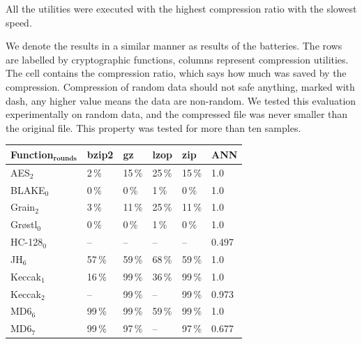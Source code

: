 \documentclass[
    digital,    %
    oneside,    %
    color,
    11pt,
    nocover,
    notable,
    nolof,
    nolot,
]{fithesis3}
\newcommand{\fd}{\cellcolor{myred!15}}
\newcommand{\fn}{\cellcolor{mygreen!20}}
\begin{document}
All the utilities were executed with the highest compression ratio with the slowest speed.

We denote the results in a similar manner as results of the batteries. The rows are labelled by cryptographic functions, columns represent compression utilities. The cell contains the compression ratio, which says how much was saved by the compression. Compression of random data should not safe anything, marked with dash, any higher value means the data are non-random. We tested this evaluation experimentally on random data, and the compressed file was never smaller than the original file. This property was tested for more than ten samples.

\begin{table}[t]
\centering

\begin{tabular}{@{}l|lllll}
\textbf{\large Function$_{\textbf{rounds}}$} & 
\multicolumn{1}{R{1.1cm}}{\textbf{bzip2}} &
\multicolumn{1}{R{1.1cm}}{\textbf{gz}} &
\multicolumn{1}{R{1.1cm}}{\textbf{lzop}} &
\multicolumn{1}{R{1.1cm}}{\textbf{zip}} &
\multicolumn{1}{R{1.1cm}}{\textbf{ANN}} \\ \hline
AES$_{2}$                        & 2\,\%  \fd & 15\,\% \fd & 25\,\% \fd & 15\,\% \fd & 1.0   \fd \\ \hline
BLAKE$_{0}$                      & 0\,\%  \fd & 0\,\%  \fd & 1\,\%  \fd & 0\,\%  \fd & 1.0   \fd \\ \hline
Grain$_{2}$                      & 3\,\%  \fd & 11\,\% \fd & 25\,\% \fd & 11\,\% \fd & 1.0   \fd \\ \hline
Gr\o{}stl$_{0}$                  & 0\,\%  \fd & 0\,\%  \fd & 1\,\%  \fd & 0\,\%  \fd & 1.0   \fd \\ \hline
HC-128$_{0}$                     & --     \fn & --     \fn & --     \fn & --     \fn & 0.497 \fn \\ \hline
JH$_{6}$                         & 57\,\% \fd & 59\,\% \fd & 68\,\% \fd & 59\,\% \fd & 1.0   \fd \\ \hline
Keccak$_{1}$                     & 16\,\% \fd & 99\,\% \fd & 36\,\% \fd & 99\,\% \fd & 1.0   \fd \\
Keccak$_{2}$                     & --     \fn & 99\,\% \fd & --     \fn & 99\,\% \fd & 0.973 \fd \\ \hline
MD6$_{6}$                        & 99\,\% \fd & 99\,\% \fd & 59\,\% \fd & 99\,\% \fd & 1.0   \fd \\
MD6$_{7}$                        & 99\,\% \fd & 97\,\% \fd & --     \fn & 97\,\% \fd & 0.677 \fd \\ \hline

\end{tabular}
\end{table}
\end{document}
